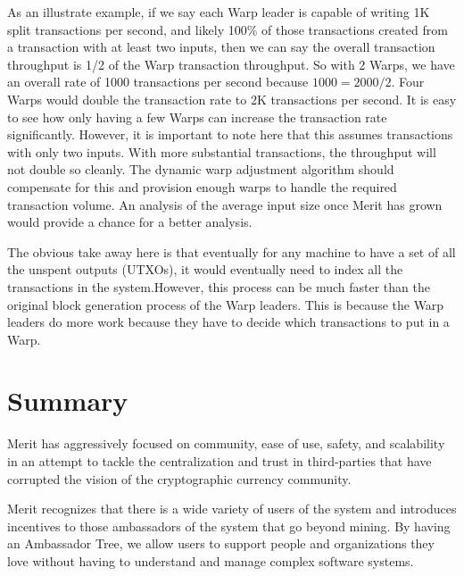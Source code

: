 \documentclass{article}
\begin{document}
As an illustrate example, if we say each Warp leader is capable of writing 1K split
transactions per second, and likely 100\% of those transactions created from a
transaction with at least two inputs, then we can say the overall transaction
throughput is 1/2 of the Warp transaction throughput.  So with 2 Warps, we have
an overall rate of 1000 transactions per second because $1000 = 2000/2$.  Four
Warps would double the transaction rate to 2K transactions per second.  It is 
easy to see how only having a few Warps can increase the transaction rate
significantly.  However, it is important to note here that this assumes transactions
with only two inputs.  With more substantial transactions, the throughput will not
double so cleanly.  The dynamic warp adjustment algorithm should compensate for
this and provision enough warps to handle the required transaction volume.  An
analysis of the average input size once Merit has grown would provide a chance
for a better analysis.

The obvious take away here is that eventually for any machine to have a set of
all the unspent outputs (UTXOs), it would eventually need to index all the
transactions in the system.However, this process can be much faster than the
original block generation process of the Warp leaders.  This is because the Warp
leaders do more work because they have to decide which transactions to put in a Warp.

\section{Summary}

Merit has aggressively focused on community, ease of use, safety, and scalability in an
attempt to tackle the centralization and trust in third-parties that have corrupted
the vision of the cryptographic currency community.

Merit recognizes that there is a wide variety of users of the system and introduces
incentives to those ambassadors of the system that go beyond mining.  By having
an Ambassador Tree, we allow users to support people and organizations they love
without having to understand and manage complex software systems.

\clearpage
\printglossaries
\end{document}

